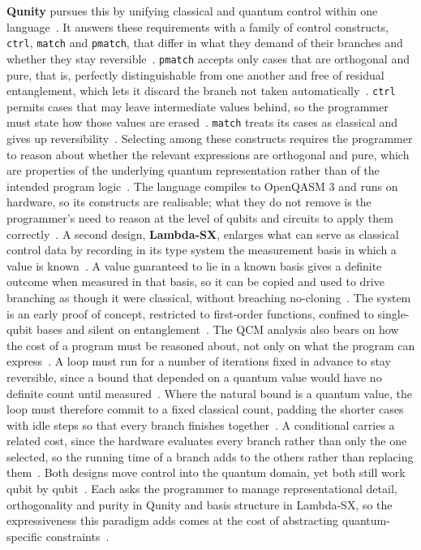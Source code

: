 \textbf{Qunity} pursues this by unifying classical and quantum control within one language~\cite{mints2025qunity}.
It answers these requirements with a family of control constructs, \texttt{ctrl}, \texttt{match} and \texttt{pmatch}, that differ in what they demand of their branches and whether they stay reversible~\cite{mints2025qunity}.
\texttt{pmatch} accepts only cases that are orthogonal and pure, that is, perfectly distinguishable from one another and free of residual entanglement, which lets it discard the branch not taken automatically~\cite{mints2025qunity}.
\texttt{ctrl} permits cases that may leave intermediate values behind, so the programmer must state how those values are erased~\cite{mints2025qunity}.
\texttt{match} treats its cases as classical and gives up reversibility~\cite{mints2025qunity}.
Selecting among these constructs requires the programmer to reason about whether the relevant expressions are orthogonal and pure, which are properties of the underlying quantum representation rather than of the intended program logic~\cite{mints2025qunity}.
The language compiles to OpenQASM 3 and runs on hardware, so its constructs are realisable; what they do not remove is the programmer's need to reason at the level of qubits and circuits to apply them correctly~\cite{mints2025qunity}.
A second design, \textbf{Lambda-SX}, enlarges what can serve as classical control data by recording in its type system the measurement basis in which a value is known~\cite{diazcaro2025lambdasx}.
A value guaranteed to lie in a known basis gives a definite outcome when measured in that basis, so it can be copied and used to drive branching as though it were classical, without breaching no-cloning~\cite{diazcaro2025lambdasx}.
The system is an early proof of concept, restricted to first-order functions, confined to single-qubit bases and silent on entanglement~\cite{diazcaro2025lambdasx}.
The QCM analysis also bears on how the cost of a program must be reasoned about, not only on what the program can express~\cite{yuan2025foundationalabstractions}.
A loop must run for a number of iterations fixed in advance to stay reversible, since a bound that depended on a quantum value would have no definite count until measured~\cite{yuan2025foundationalabstractions}.
Where the natural bound is a quantum value, the loop must therefore commit to a fixed classical count, padding the shorter cases with idle steps so that every branch finishes together~\cite{yuan2025foundationalabstractions}.
A conditional carries a related cost, since the hardware evaluates every branch rather than only the one selected, so the running time of a branch adds to the others rather than replacing them~\cite{yuan2025foundationalabstractions}.
Both designs move control into the quantum domain, yet both still work qubit by qubit~\cite{mints2025qunity, diazcaro2025lambdasx}.
Each asks the programmer to manage representational detail, orthogonality and purity in Qunity and basis structure in Lambda-SX, so the expressiveness this paradigm adds comes at the cost of abstracting quantum-specific constraints~\cite{mints2025qunity, diazcaro2025lambdasx}.

